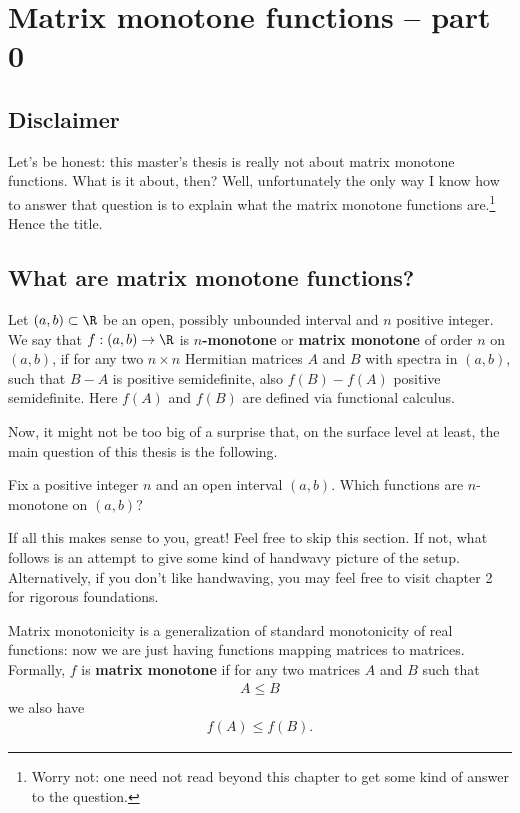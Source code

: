 \chapter{Matrix monotone functions -- part 0}

\section{Disclaimer}

Let's be honest: this master's thesis is really not about matrix monotone functions. What is it about, then? Well, unfortunately the only way I know how to answer that question is to explain what the matrix monotone functions are.\footnote{Worry not: one need not read beyond this chapter to get some kind of answer to the question.} Hence the title.

\section{What are matrix monotone functions?}

\begin{maar}\label{main_def}
	Let $(a,b) \subset \R$ be an open, possibly unbounded interval and $n$ positive integer. We say that $f : (a, b) \to \R$ is \textbf{$n$-monotone} or \textbf{matrix monotone} of order \textbf{$n$} on $(a, b)$, if for any two $n \times n$ Hermitian matrices $A$ and $B$ with spectra in $(a, b)$, such that $B - A$ is positive semidefinite, also $f(B) - f(A)$ positive semidefinite. Here $f(A)$ and $f(B)$ are defined via functional calculus.
\end{maar}

Now, it might not be too big of a surprise that, on the surface level at least, the main question of this thesis is the following.

\begin{quest}\label{question_1}
	Fix a positive integer $n$ and an open interval $(a, b)$. Which functions are $n$-monotone on $(a, b)$?
\end{quest}

If all this makes sense to you, great! Feel free to skip this section. If not, what follows is an attempt to give some kind of handwavy picture of the setup. Alternatively, if you don't like handwaving, you may feel free to visit chapter 2 for rigorous foundations.

Matrix monotonicity is a generalization of standard monotonicity of real functions: now we are just having functions mapping matrices to matrices. Formally, $f$ is \textbf{matrix monotone} if for any two matrices $A$ and $B$ such that
\begin{align}
	A \leq B
\end{align}
we also have
\begin{align}
	f(A) \leq f(B).
\end{align}

